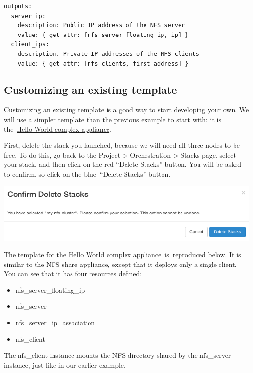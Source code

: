 \begin{footnotesize}
\begin{verbatim}
outputs:
  server_ip:
    description: Public IP address of the NFS server
    value: { get_attr: [nfs_server_floating_ip, ip] }
  client_ips:
    description: Private IP addresses of the NFS clients
    value: { get_attr: [nfs_clients, first_address] }
\end{verbatim}
\end{footnotesize}

\subsection{Customizing an existing template}

Customizing an existing template is a good way to start developing your
own. We will use a simpler template than the previous example to start
with: it is
the~\href{https://www.chameleoncloud.org/appliances/26/}{Hello World
complex appliance}.

First, delete the stack you launched, because we will need all three
nodes to be free. To do this, go back to the Project \textgreater{}
Orchestration \textgreater{} Stacks page, select your stack, and then
click on the red ``Delete Stacks'' button. You will be asked to confirm,
so click on the blue~``Delete Stacks'' button.

\includegraphics[width=\columnwidth]{images/chameleon/Delete-Stacks.png}

The template for the
\href{https://www.chameleoncloud.org/appliances/26/}{Hello World complex
appliance}~is~reproduced below. It is similar to the NFS share
appliance, except that it deploys only a single client. You can see that
it has four resources defined:

\begin{itemize}
\item
  nfs\_server\_floating\_ip
\item
  nfs\_server
\item
  nfs\_server\_ip\_association
\item
  nfs\_client
\end{itemize}

The nfs\_client instance mounts the NFS directory shared by the
nfs\_server instance, just like in our earlier example.


